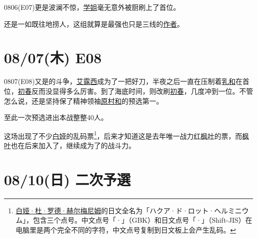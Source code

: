 0806(E07)更是波澜不惊，\uline{学姐}毫无意外被厨刷上了首位。

还是一如既往地捞人，这组就算是最强也只是三线的\uline{作者}。

\section{08/07(木) E08}


0807(E08)又是的斗争，\uline{艾露西}成为了一把好刀，半夜之后一直在压制着\uline{乳和}在首位，\uline{初春}反而没显得多么厉害。到了海底时间，则改刷\uline{初春}，几度冲到一位。不管怎么说，还是坚持保了精神领袖\uline{原村和}的预选第一。

至此一次预选进出本战整整40人。

这场出现了不少\uline{白娅}的乱码票\footnote{\uline{白娅·杜·罗德·赫尔梅尼姆}的日文全名为「{\mincho ハクア·ド·ロット·ヘルミニウム}」，包含三个点号。中文点号「·」（GBK）和日文点号「{\mincho ·}」（Shift-JIS）在电脑里是两个完全不同的字符，中文点号复制到日文板上会产生乱码。}，后来才知道这是去年唯一战力\uline{红枫叶}的票，而\uline{枫叶}也在后来加入了，继续成为了的战斗力。

\section{08/10(日) 二次予選}

